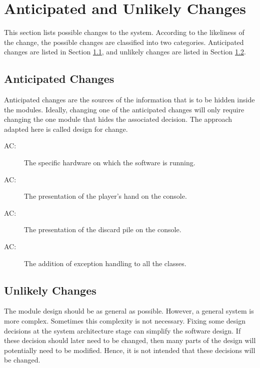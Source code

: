 \documentclass[12pt, titlepage]{article}
\newcounter{acnum}
\newcommand{\actheacnum}{AC\theacnum}
\begin{document}
\section{Anticipated and Unlikely Changes} \label{SecChange}

This section lists possible changes to the system. According to the likeliness
of the change, the possible changes are classified into two
categories. Anticipated changes are listed in Section \ref{SecAchange}, and
unlikely changes are listed in Section \ref{SecUchange}.

\subsection{Anticipated Changes} \label{SecAchange}

Anticipated changes are the sources of the information that is to be hidden inside the modules. Ideally, changing one of the anticipated changes will only require changing the one module that hides the associated decision. The approach adapted here is called design for change.

\begin{description}
    \item[ \actheacnum \label{acHardware}:] The specific
      hardware on which the software is running.
    \item[ \actheacnum \label{acH}:] The presentation of the player's hand on the console.
    \item[ \actheacnum \label{acDP}:] The presentation of the discard pile on the console.
    \item[ \actheacnum \label{acExc}:] The addition of exception handling to all the classes.
\end{description}

\subsection{Unlikely Changes} \label{SecUchange}

The module design should be as general as possible. However, a general system is
more complex. Sometimes this complexity is not necessary. Fixing some design
decisions at the system architecture stage can simplify the software design. If
these decision should later need to be changed, then many parts of the design
will potentially need to be modified. Hence, it is not intended that these
decisions will be changed.
\end{document}
